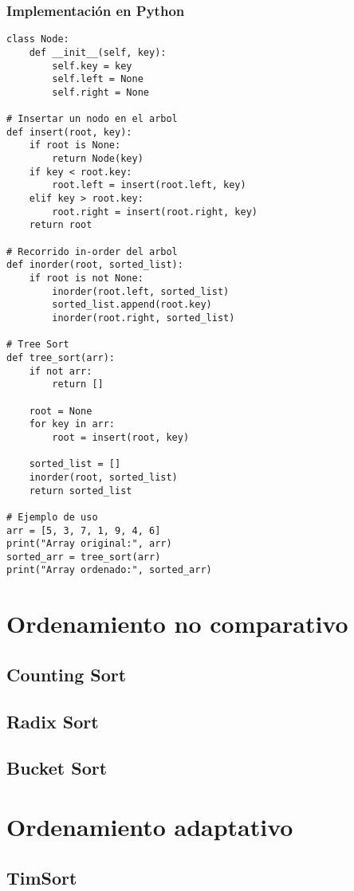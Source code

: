 \documentclass[11pt,openany]{book}
\begin{document}
\subsubsection{Implementación en Python}
\lstset{language=Python}
\begin{lstlisting}
class Node:
    def __init__(self, key):
        self.key = key
        self.left = None
        self.right = None

# Insertar un nodo en el arbol
def insert(root, key):
    if root is None:
        return Node(key)
    if key < root.key:
        root.left = insert(root.left, key)
    elif key > root.key:
        root.right = insert(root.right, key)
    return root

# Recorrido in-order del arbol
def inorder(root, sorted_list):
    if root is not None:
        inorder(root.left, sorted_list)
        sorted_list.append(root.key)
        inorder(root.right, sorted_list)

# Tree Sort
def tree_sort(arr):
    if not arr:
        return []

    root = None
    for key in arr:
        root = insert(root, key)

    sorted_list = []
    inorder(root, sorted_list)
    return sorted_list

# Ejemplo de uso
arr = [5, 3, 7, 1, 9, 4, 6]
print("Array original:", arr)
sorted_arr = tree_sort(arr)
print("Array ordenado:", sorted_arr)
\end{lstlisting}

\section{Ordenamiento no comparativo}
\subsection{Counting Sort}
\subsection{Radix Sort}
\subsection{Bucket Sort}

\section{Ordenamiento adaptativo}
\subsection{TimSort}
\end{document}
